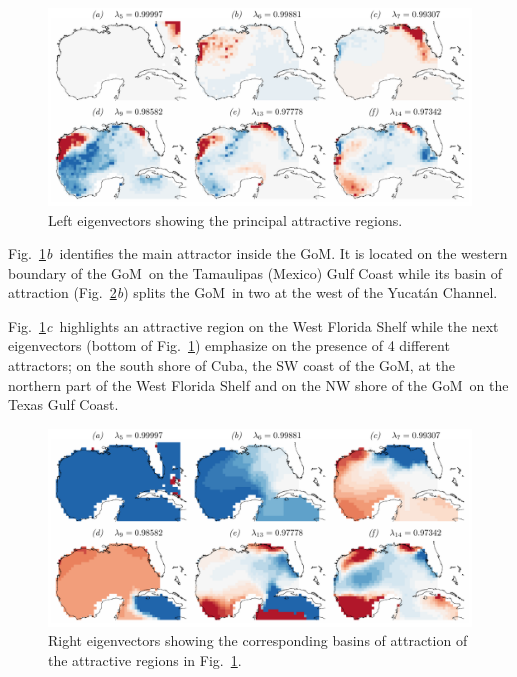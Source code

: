 \documentclass[final]{beamer}
\newcommand{\ib}{\textit{b}}
\newcommand{\ic}{\textit{c}}
\newcommand{\gom}{GoM}
\begin{document}
\begin{frame}[t]
\begin{multicols}{3}
\begin{figure}
\centering
\includegraphics[width=\columnwidth]{figures/fig06}
\caption{Left eigenvectors showing the principal attractive regions.}
\label{fig:l_eig}
\end{figure}

Fig.~\ref{fig:l_eig}\ib\ identifies the main attractor inside the \gom. It is
located on the western boundary of the \gom\ on the Tamaulipas (Mexico) Gulf
Coast while its basin of attraction (Fig.~\ref{fig:r_eig}\ib) splits the \gom\
in two at the west of the Yucat\'{a}n Channel.
 
Fig.~\ref{fig:l_eig}\ic\ highlights an attractive region on the West Florida
Shelf while the next eigenvectors (bottom of Fig.~\ref{fig:l_eig}) emphasize on
the presence of 4 different attractors; on  the south shore of Cuba, the SW
coast of the \gom, at the northern part of the West Florida Shelf and on the NW
shore of the \gom\ on the Texas Gulf Coast.
\begin{figure}
\centering
\includegraphics[width=\columnwidth]{figures/fig07}
\caption{Right eigenvectors showing the corresponding basins of attraction of
the attractive regions in Fig.~\ref{fig:l_eig}.}
\label{fig:r_eig}
\end{figure}

\vspace{0.5cm}
\columnbreak

\end{multicols}
\end{frame}
\end{document}
